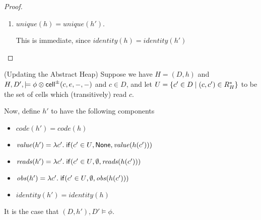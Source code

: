 \begin{proof}
\begin{enumerate}
\item $\mathit{unique}(h) = \mathit{unique}(h')$.

This is immediate, since $\mathit{identity}(h) = \mathit{identity}(h')$ 
\end{enumerate}
\end{proof}


\begin{lemma}{(Updating the Abstract Heap)}
Suppose we have $H = (D,h)$ and $H, D', \models \phi \otimes
\mathsf{cell}^{\pm}({c}, {e}, {-}, {-})$ and $c \in D$, and let $U = \{{{c' \in
  D}\;|\;{(c,c') \in R^*_H}}\}$ to be the set of cells which (transitively)
read $c$.

Now, define $h'$ to have the following components
\begin{itemize}
\item $\mathit{code}(h') = \mathit{code}(h)$
\item $\mathit{value}(h') = \lambda c'.\;\mathsf{if}({c'\in U}, {\mathsf{None}}, {\mathit{value}(h(c'))})$
\item $\mathit{reads}(h') = \lambda c'.\;\mathsf{if}({c'\in U}, {\emptyset}, {\mathit{reads}(h(c'))})$
\item $\mathit{obs}(h') = \lambda c'.\;\mathsf{if}({c'\in U}, {\emptyset}, {\mathit{obs}(h(c'))})$
\item $\mathit{identity}(h') = \mathit{identity}(h)$
\end{itemize}

It is the case that $(D, h'), D' \models \phi$. 
\end{lemma}

